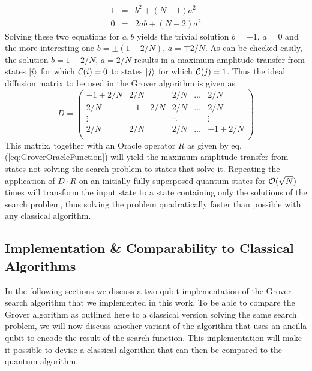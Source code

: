 %
\begin{eqnarray}
 1 & = & b^2+(N-1)a^2 \\
0 & = & 2ab +(N-2)a^2
\end{eqnarray}
%
Solving these two equations for $a,b$ yields the trivial solution $b = \pm 1$, $a = 0$ and the more interesting one $b = \pm(1-2/N)$, $a=\mp 2/N$. As can be checked easily, the solution $b = 1-2/N$, $a = 2/N$ results in a maximum amplitude transfer from states $\left| i \right>$ for which $\Or(i)=0$ to states $\left| j \right>$ for which $\Or(j)=1$. Thus the ideal diffusion matrix to be used in the Grover algorithm is given as
%
\begin{equation}
D = \left( \begin{array}{ccccc}
	-1+2/N & 2/N & 2/N & \hdots & 2/N \\
	2/N & -1 + 2/N & 2/N & \hdots & 2/N \\
	\vdots & & \ddots &  & \vdots \\
	2/N & 2/N & 2/N & \hdots & -1 + 2/N \\ 
	\end{array} \right) \label{eq:GroverDiffusionOperator}
\end{equation}
%
This matrix, together with an Oracle operator $R$ as given by eq. (\ref{eq:GroverOracleFunction}) will yield the maximum amplitude transfer from states not solving the search problem to states that solve it. Repeating the application of $D\cdot R$ on an initially fully superposed quantum states for $\begin{mathcal}O\end{mathcal}(\sqrt{N})$ times will transform the input state to a state containing only the solutions of the search problem, thus solving the problem quadratically faster than possible with any classical algorithm.

\subsection{Implementation \& Comparability to Classical Algorithms}

In the following sections we discuss a two-qubit implementation of the Grover search algorithm that we implemented in this work. To be able to compare the Grover algorithm as outlined here to a classical version solving the same search problem, we will now discuss another variant of the algorithm that uses an ancilla qubit to encode the result of the search function. This implementation will make it possible to devise a classical algorithm that can then be compared to the quantum algorithm. 

